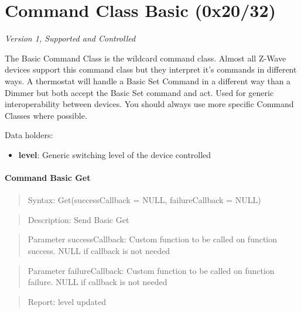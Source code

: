 

\section{Command Class Basic (0x20/32)}

\textit{Version 1, Supported and Controlled}
\newline

The Basic Command Class is the wildcard command class. Almost all Z-Wave devices support this command class but they interpret it's commands in different ways. A thermostat will handle a Basic Set Command in a different way than a Dimmer but both accept the Basic Set command and act. Used for generic interoperability between devices. You should always use more specific Command Classes where possible.
\newline

\noindent
Data holders:

\begin{itemize}
\item \textbf{level}: Generic switching level of the device controlled
\end{itemize}

\paragraph{Command Basic Get}
\begin{quote}Syntax: Get(successCallback = NULL, failureCallback = NULL)\end{quote}
\begin{quote}Description: Send Basic Get\end{quote}
\begin{quote}Parameter successCallback: Custom function to be called on function success. NULL if callback is not needed\end{quote}
\begin{quote}Parameter failureCallback: Custom function to be called on function failure. NULL if callback is not needed\end{quote}
\begin{quote}Report: level updated\end{quote}

